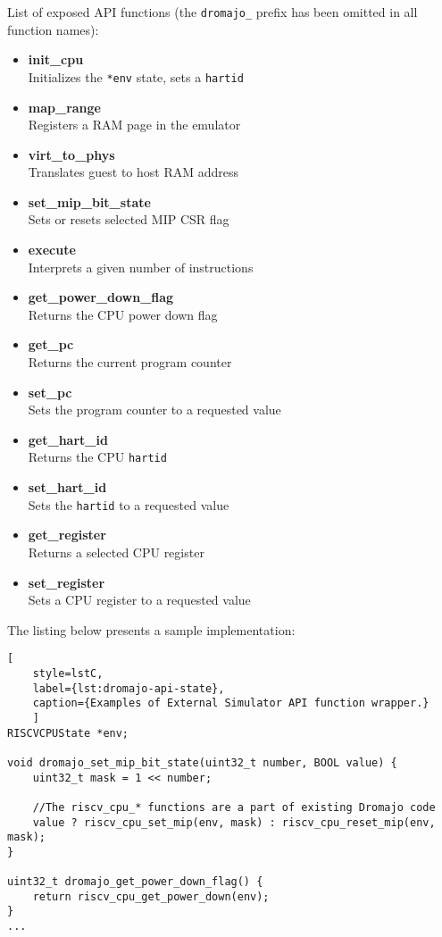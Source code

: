 \vspace{10px}
\noindent
List of exposed API functions (the \texttt{dromajo\_} prefix has been omitted in all function names):
\begin{multicols}{2}
    \begin{itemize}
        \item{\textbf{init\_cpu}\\Initializes the \texttt{*env} state, sets a \texttt{hartid} }
        \item{\textbf{map\_range}\\Registers a RAM page in the emulator}
        \item{\textbf{virt\_to\_phys}\\Translates guest to host RAM address}
        \item{\textbf{set\_mip\_bit\_state}\\Sets or resets selected MIP CSR flag}
        \item{\textbf{execute}\\Interprets a given number of instructions} 
        \item{\textbf{get\_power\_down\_flag}\\Returns the CPU power down flag}
        \item{\textbf{get\_pc}\\Returns the current program counter}
        \item{\textbf{set\_pc}\\Sets the program counter to a requested value}
        \item{\textbf{get\_hart\_id}\\Returns the CPU \texttt{hartid}}
        \item{\textbf{set\_hart\_id}\\Sets the \texttt{hartid} to a requested value}
        \item{\textbf{get\_register}\\Returns a selected CPU register}
        \item{\textbf{set\_register}\\Sets a CPU register to a requested value}
    \end{itemize}
\end{multicols}

\noindent
The listing below presents a sample implementation:

\begin{lstlisting}[
    style=lstC,
    label={lst:dromajo-api-state},
    caption={Examples of External Simulator API function wrapper.}
    ]
RISCVCPUState *env;

void dromajo_set_mip_bit_state(uint32_t number, BOOL value) {
    uint32_t mask = 1 << number;

    //The riscv_cpu_* functions are a part of existing Dromajo code
    value ? riscv_cpu_set_mip(env, mask) : riscv_cpu_reset_mip(env, mask);
}

uint32_t dromajo_get_power_down_flag() {
    return riscv_cpu_get_power_down(env);
}
...
\end{lstlisting}

